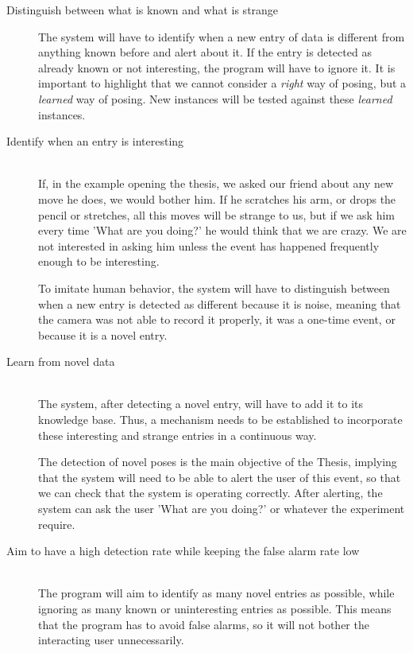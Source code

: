 \begin{description}

  \item[Distinguish between what is known and what is strange] \hfill \newline
The system will have to identify when a new entry of data is different from anything known before and alert about it. If the entry is detected as already known or not interesting, the program will have to ignore it. It is important to highlight that we cannot consider a \emph{right} way of posing, but a \emph{learned} way of posing. New instances will be tested against these \emph{learned} instances.

\clearpage
  \item[Identify when an entry is interesting] \hfill \\
If, in the example opening the thesis, we asked our friend about any new move he does, we would bother him. If he scratches his arm, or drops the pencil or stretches, all this moves will be strange to us, but if we ask him every time 'What are you doing?' he would think that we are crazy. We are not interested in asking him unless the event has happened frequently enough to be interesting.

To imitate human behavior, the system will have to distinguish between when a new entry is detected as different because it is noise, meaning that the camera was not able to record it properly, it was a one-time event, or because it is a novel entry.

  \item[Learn from novel data] \hfill \\
The system, after detecting a novel entry, will have to add it to its knowledge base. Thus, a mechanism needs to be established to incorporate these interesting and strange entries in a continuous way. 

The detection of novel poses is the main objective of the Thesis, implying that the system will need to be able to alert the user of this event, so that we can check that the system is operating correctly. After alerting, the system can ask the user 'What are you doing?' or whatever the experiment require. 

\item[Aim to have a high detection rate while keeping the false alarm rate low] \hfill \\
  The program will aim to identify as many novel entries as possible, while ignoring as many known or uninteresting entries as possible. This means that the program has to avoid false alarms, so it will not bother the interacting user unnecessarily. 


\end{description}
